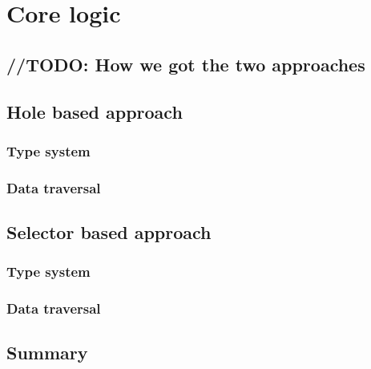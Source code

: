 \chapter{Core logic}
\label{chap:core-logic}

\section{//TODO: How we got the two approaches}

\section{Hole based approach}
\subsection{Type system}
\subsection{Data traversal}
\subsection{}
\section{Selector based approach}
\subsection{Type system}
\subsection{Data traversal}
\subsection{}

\section{Summary}
